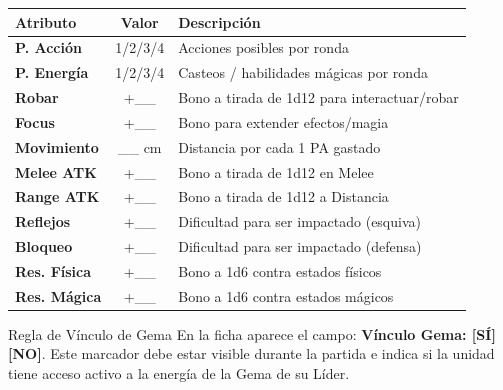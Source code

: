 \begin{tabularx}{\linewidth}{|l|c|X|}
\hline
\rowcolor{HammerRed!15} \textbf{Atributo} & \textbf{Valor} & \textbf{Descripción} \\ \hline
\textbf{P. Acción} & 1/2/3/4 & Acciones posibles por ronda \\ \hline
\textbf{P. Energía} & 1/2/3/4 & Casteos / habilidades mágicas por ronda \\ \hline
\textbf{Robar} & +\_\_ & Bono a tirada de 1d12 para interactuar/robar \\ \hline
\textbf{Focus} & +\_\_ & Bono para extender efectos/magia \\ \hline
\textbf{Movimiento} & \_\_ cm & Distancia por cada 1 PA gastado \\ \hline
\textbf{Melee ATK} & +\_\_ & Bono a tirada de 1d12 en Melee \\ \hline
\textbf{Range ATK} & +\_\_ & Bono a tirada de 1d12 a Distancia \\ \hline
\textbf{Reflejos} & +\_\_ & Dificultad para ser impactado (esquiva) \\ \hline
\textbf{Bloqueo} & +\_\_ & Dificultad para ser impactado (defensa) \\ \hline
\textbf{Res. Física} & +\_\_ & Bono a 1d6 contra estados físicos \\ \hline
\textbf{Res. Mágica} & +\_\_ & Bono a 1d6 contra estados mágicos \\ \hline
\end{tabularx}

\vspace{0.4cm}

\begin{reglaespecial}{Regla de Vínculo de Gema}
En la ficha aparece el campo: \textbf{Vínculo Gema: [SÍ] [NO]}. Este marcador debe estar visible durante la partida e indica si la unidad tiene acceso activo a la energía de la Gema de su Líder.
\end{reglaespecial}

